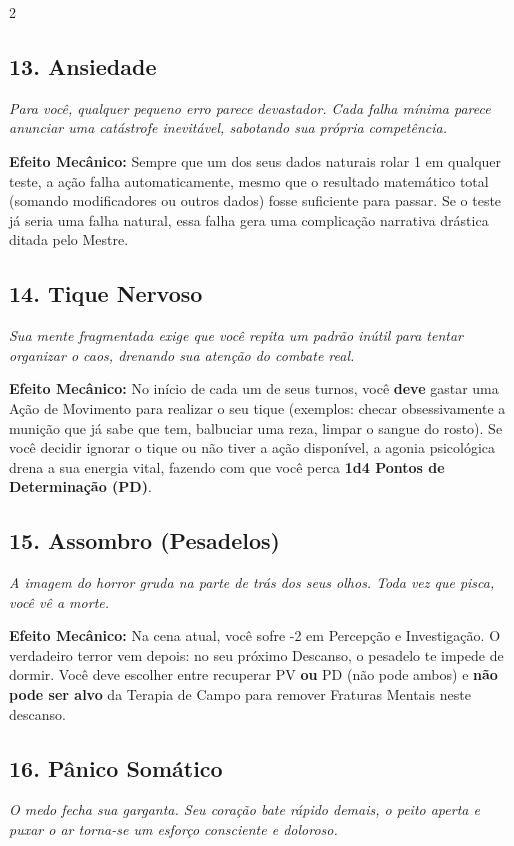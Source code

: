 \documentclass[a4paper,11pt,openany]{book}
\begin{document}
\begin{multicols}{2}
\subsection*{13. Ansiedade}
\textit{Para você, qualquer pequeno erro parece devastador. Cada falha mínima parece anunciar uma catástrofe inevitável, sabotando sua própria competência.}

\textbf{Efeito Mecânico:} Sempre que um dos seus dados naturais rolar 1 em qualquer teste, a ação falha automaticamente, mesmo que o resultado matemático total (somando modificadores ou outros dados) fosse suficiente para passar. Se o teste já seria uma falha natural, essa falha gera uma complicação narrativa drástica ditada pelo Mestre.

\subsection*{14. Tique Nervoso}
\textit{Sua mente fragmentada exige que você repita um padrão inútil para tentar organizar o caos, drenando sua atenção do combate real.}

\textbf{Efeito Mecânico:} No início de cada um de seus turnos, você \textbf{deve} gastar uma Ação de Movimento para realizar o seu tique (exemplos: checar obsessivamente a munição que já sabe que tem, balbuciar uma reza, limpar o sangue do rosto). Se você decidir ignorar o tique ou não tiver a ação disponível, a agonia psicológica drena a sua energia vital, fazendo com que você perca \textbf{1d4 Pontos de Determinação (PD)}.

\subsection*{15. Assombro (Pesadelos)}
\textit{A imagem do horror gruda na parte de trás dos seus olhos. Toda vez que pisca, você vê a morte.}

\textbf{Efeito Mecânico:} Na cena atual, você sofre -2 em Percepção e Investigação. O verdadeiro terror vem depois: no seu próximo Descanso, o pesadelo te impede de dormir. Você deve escolher entre recuperar PV \textbf{ou} PD (não pode ambos) e \textbf{não pode ser alvo} da Terapia de Campo para remover Fraturas Mentais neste descanso.

\subsection*{16. Pânico Somático}
\textit{O medo fecha sua garganta. Seu coração bate rápido demais, o peito aperta e puxar o ar torna-se um esforço consciente e doloroso.}


\end{multicols}
\end{document}
